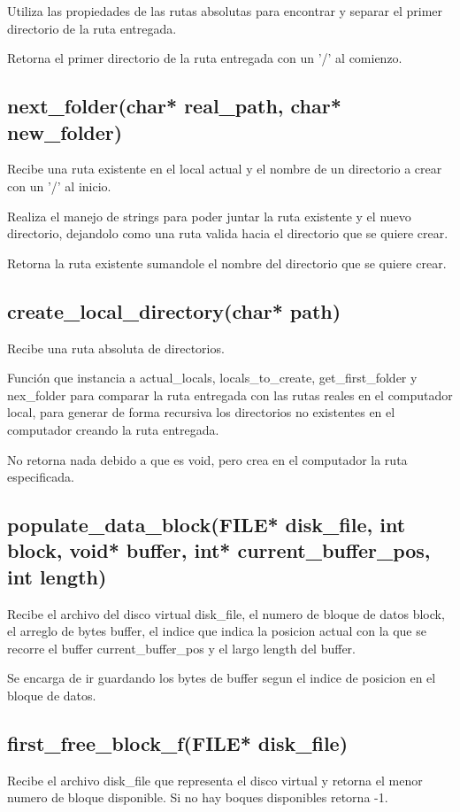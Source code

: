\documentclass[12pt]{article}
\begin{document}
Utiliza las propiedades de las rutas absolutas para encontrar y separar el primer directorio de la ruta entregada.

Retorna el primer directorio de la ruta entregada con un '/' al comienzo.

\subsection{next\_folder(char* real\_path, char* new\_folder)}
Recibe una ruta existente en el local actual y el nombre de un directorio a crear con un '/' al inicio.

Realiza el manejo de strings para poder juntar la ruta existente y el nuevo directorio, dejandolo como una ruta valida hacia el directorio que se quiere crear. 

Retorna la ruta existente sumandole el nombre del directorio que se quiere crear.

\subsection{create\_local\_directory(char* path)}
Recibe una ruta absoluta de directorios.

Función que instancia a actual\_locals, locals\_to\_create, get\_first\_folder y nex\_folder para comparar la ruta entregada con las rutas reales en el computador local, para generar de forma recursiva los directorios no existentes en el computador creando la ruta entregada.

No retorna nada debido a que es void, pero crea en el computador la ruta especificada.

\subsection{populate\_data\_block(FILE* disk\_file, int block, 
  void* buffer, int* current\_buffer\_pos, int length) }
Recibe el archivo del disco virtual disk\_file, el numero de bloque de datos block, el arreglo de bytes buffer, el indice que indica la posicion actual con la que se recorre el buffer current\_buffer\_pos y el largo length del buffer.

Se encarga de ir guardando los bytes de buffer segun el indice de posicion en el bloque de datos.

\subsection{first\_free\_block\_f(FILE* disk\_file)}
Recibe el archivo disk\_file que representa el disco virtual y retorna el menor numero de bloque disponible. Si no hay boques disponibles retorna -1.
\end{document}
